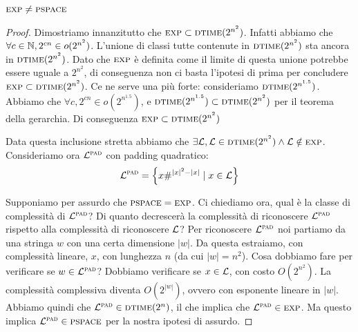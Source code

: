 \begin{thm}
    $\textsc{exp} \not= \textsc{pspace}$
\end{thm}
\begin{proof}
    
    Dimostriamo innanzitutto che $\textsc{exp} \subset \textsc{dtime}(2^{n^{2}})$. Infatti abbiamo che $\forall c
    \in \mathbb{N}, 2^{cn} \in o(2^{n^{2}})$. L'unione di classi tutte contenute in $\textsc{dtime}(2^{n^{2}})$
    sta ancora in $\textsc{dtime}(2^{n^{2}})$. Dato che $\textsc{exp}$ è definita come il limite di questa unione
    potrebbe essere uguale a $2^{n^{2}}$, di conseguenza non ci basta l'ipotesi di prima per
    concludere $\textsc{exp} \subset \textsc{dtime}(2^{n^{2}})$. Ce ne serve una più forte: consideriamo
    $\textsc{dtime}(2^{n^{1.5}})$. Abbiamo che $\forall c,2^{cn} \in o(2^{n^{1.5}})$, e $\textsc{dtime}(2^{n^{1.5}})
    \subset \textsc{dtime}(2^{n^{2}})$ per il teorema della gerarchia. Di conseguenza $\textsc{exp} \subset
    \textsc{dtime}(2^{n^{2}})$

    Data questa inclusione stretta abbiamo che $\exists \mathcal{L}, \mathcal{L} \in \textsc{dtime}(2^{n^{2}}) \land
    \mathcal{L} \notin \textsc{exp}$. Consideriamo ora $\mathcal{L}^{\textsc{pad}}$ con padding quadratico:
    \begin{equation*}
        \mathcal{L}^{\textsc{pad}} = \left\{ x\#^{|x|^{2}-|x|} \mid x \in \mathcal{L}\right\}
    \end{equation*}

    Supponiamo per assurdo che $\textsc{pspace} = \textsc{exp}$. Ci chiediamo ora, qual è la classe di complessità
    di $\mathcal{L}^{\textsc{pad}}$? Di quanto decrescerà la complessità di riconoscere $\mathcal{L}^{\textsc{pad}}$ rispetto alla
    complessità di riconoscere $\mathcal{L}$? Per riconoscere $\mathcal{L}^{\textsc{pad}}$ noi partiamo da una stringa $w$ con
    una certa dimensione $|w|$. Da questa estraiamo, con complessità lineare, $x$, con lunghezza
    $n$ (da cui $|w| = n^{2}$). Cosa dobbiamo fare per verificare se $w \in \mathcal{L}^{\textsc{pad}}$?  Dobbiamo
    verificare se $x \in \mathcal{L}$, con costo $O(2^{n^{2}})$. La complessità complessiva diventa
    $O(2^{|w|})$, ovvero con esponente lineare in $|w|$. Abbiamo quindi che $\mathcal{L}^{\textsc{pad}} \in
    \textsc{dtime}(2^{n})$, il che implica che $\mathcal{L}^{\textsc{pad}} \in \textsc{exp}$. Ma questo implica  $\mathcal{L}^{\textsc{pad}} \in \textsc{pspace}$ per
    la nostra ipotesi di assurdo.


\end{proof}
